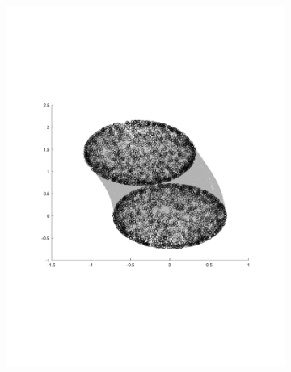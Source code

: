 \begin{figure}
    \centering
    \begin{subfigure}[b]{0.3\textwidth}
        \includegraphics[width=\textwidth]{figures/experiments/FunnelSim2}
    \end{subfigure}
    \begin{subfigure}[b]{0.3\textwidth}

\end{subfigure}
\end{figure}
